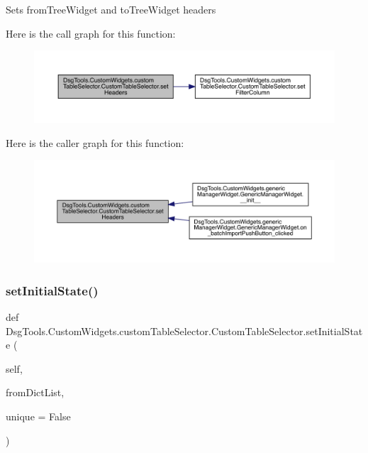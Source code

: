 \begin{DoxyVerb}Sets fromTreeWidget and toTreeWidget headers
\end{DoxyVerb}
 Here is the call graph for this function\+:
\nopagebreak
\begin{figure}[H]
\begin{center}
\leavevmode
\includegraphics[width=350pt]{class_dsg_tools_1_1_custom_widgets_1_1custom_table_selector_1_1_custom_table_selector_a5dafcf0c8a8e0ec2a15f4a454e0e4602_cgraph}
\end{center}
\end{figure}
Here is the caller graph for this function\+:
\nopagebreak
\begin{figure}[H]
\begin{center}
\leavevmode
\includegraphics[width=350pt]{class_dsg_tools_1_1_custom_widgets_1_1custom_table_selector_1_1_custom_table_selector_a5dafcf0c8a8e0ec2a15f4a454e0e4602_icgraph}
\end{center}
\end{figure}
\mbox{\label{class_dsg_tools_1_1_custom_widgets_1_1custom_table_selector_1_1_custom_table_selector_a652d2b7bc88ffaa2fa68245381aa21df}} 
\subsubsection{\texorpdfstring{set\+Initial\+State()}{setInitialState()}}
{\footnotesize\ttfamily def Dsg\+Tools.\+Custom\+Widgets.\+custom\+Table\+Selector.\+Custom\+Table\+Selector.\+set\+Initial\+State (\begin{DoxyParamCaption}\item[{}]{self,  }\item[{}]{from\+Dict\+List,  }\item[{}]{unique = {\ttfamily False} }\end{DoxyParamCaption})}

